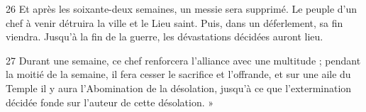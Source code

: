 
26 Et après les soixante-deux semaines, un messie sera supprimé. Le peuple d’un chef à venir détruira la ville et le Lieu saint. Puis, dans un déferlement, sa fin viendra. Jusqu’à la fin de la guerre, les dévastations décidées auront lieu.

27 Durant une semaine, ce chef renforcera l’alliance avec une multitude ; pendant la moitié de la semaine, il fera cesser le sacrifice et l’offrande, et sur une aile du Temple il y aura l’Abomination de la désolation, jusqu’à ce que l’extermination décidée fonde sur l’auteur de cette désolation. »

